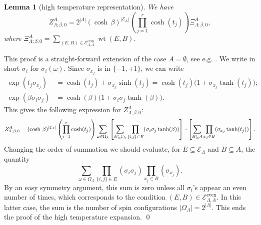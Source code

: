 \documentclass{amsart}
\DeclareMathOperator\wt{wt}
\def\EEE{\mathcal{E}}
\numberwithin{equation}{section}
\newtheorem{lemma}[theorem]{Lemma}
\theoremstyle{remark}
\renewenvironment{proof}[1][Proof]{\begin{trivlist}
\item[\hskip \labelsep {\bfseries #1:}]}{\qed\end{trivlist}}
\begin{document}
\begin{lemma}
  [high temperature representation]
We have
\begin{equation}
Z^A_{\Lambda; \beta,0} = 2^{|\Lambda|} (\cosh\, \beta)^{|\EEE_\Lambda|}
\left(\prod_{j=1}^r \cosh(t_j) \right) \Xi^A_{\Lambda;\beta,0},
\label{eq:PartFunction_HighTemperature_Modified}
\end{equation}
where $\Xi^A_{\Lambda;\beta,0}=\sum_{(E,B) \in \mathcal{E}^{\text{even}}_{\Lambda,A}} \wt(E,B)$.
  \label{lem:HTR}
\end{lemma}
\begin{proof}
  This proof is a straight-forward extension of the case $A=\emptyset$, see e.g.  \cite[Eq. (5.40)]{Velenik}.
  We write in short $\sigma_i$ for $\sigma_i(\omega)$.
  Since $\sigma_{x_j}$ is in $\{-1,+1\}$, we can write 
  \begin{align*}
    \exp(t_j \sigma_{x_j}) &= \cosh(t_j) + \sigma_{x_j} \sinh(t_j) 
    = \cosh(t_j) \big(1 + \sigma_{x_j} \tanh(t_j));\\
    \exp(\beta \sigma_i \sigma_j) &= \cosh(\beta) \big(1 + \sigma_i \sigma_j \tanh(\beta) \big).
  \end{align*}
  This gives the following expression for $Z^A_{\Lambda; \beta,0}$:
  \[
    Z^A_{\Lambda; \beta,0}= (\cosh\, \beta)^{|\EEE_\Lambda|}
  \left(\prod_{j=1}^r \cosh(t_j) \right) \sum_{\omega \in \Omega_{\Lambda}}
  \left[ \sum_{E \subseteq \EEE_\Lambda} \prod_{\{i,j\} \in E} (\sigma_i \sigma_j \tanh(\beta)) \right]\\
  \cdot\left[ \sum_{B \subseteq A} \prod_{x_j \in B} (\sigma_{x_j} \tanh(t_j)) \right].
  \]
  Changing the order of summation we should evaluate, for $E \subseteq \EEE_\Lambda$ and $B \subseteq A$, the quantity
  \[ \sum_{\omega \in \Omega_{\Lambda}}  \prod_{\{i,j\} \in E} 
  (\sigma_i \sigma_j) \prod_{x_j \in B} (\sigma_{x_j}). \]
  By an easy symmetry argument, this sum is zero unless all $\sigma_i$'s appear an even number of times, which corresponds to the condition $(E,B) \in \mathcal{E}^{\text{even}}_{\Lambda,A}$.
  In this latter case, the sum is the number of spin configurations $|\Omega_{\Lambda}|=2^{|\Lambda|}$.
  This ends the proof of the high temperature expansion.
\end{proof}
\end{document}
